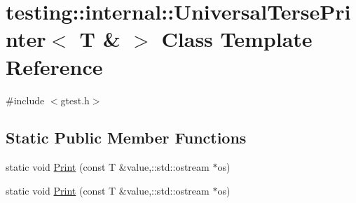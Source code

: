\hypertarget{classtesting_1_1internal_1_1_universal_terse_printer_3_01_t_01_6_01_4}{\section{testing\-:\-:internal\-:\-:Universal\-Terse\-Printer$<$ T \& $>$ Class Template Reference}
\label{classtesting_1_1internal_1_1_universal_terse_printer_3_01_t_01_6_01_4}
}


{\ttfamily \#include $<$gtest.\-h$>$}

\subsection*{Static Public Member Functions}
\begin{DoxyCompactItemize}
\item 
static void \hyperlink{classtesting_1_1internal_1_1_universal_terse_printer_3_01_t_01_6_01_4_a5f0d2e50bb18c00d019389fca869b9d0}{Print} (const T \&value,\-::std\-::ostream $\ast$os)
\item 
static void \hyperlink{classtesting_1_1internal_1_1_universal_terse_printer_3_01_t_01_6_01_4_a5f0d2e50bb18c00d019389fca869b9d0}{Print} (const T \&value,\-::std\-::ostream $\ast$os)
\end{DoxyCompactItemize}



